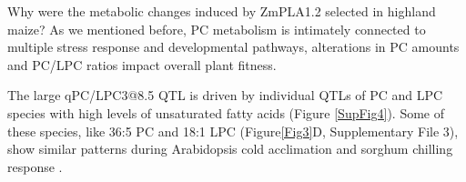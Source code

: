 \documentclass[9pt,twocolumn,twoside,lineno]{BioRxiv}
\begin{document}
Why were the metabolic changes induced by ZmPLA1.2 selected in highland maize?
As we mentioned before, PC metabolism is intimately connected to multiple stress response and developmental pathways, alterations in PC amounts and PC/LPC ratios impact overall plant fitness.

The large qPC/LPC3@8.5 QTL is driven by individual QTLs of PC and LPC species with high levels of unsaturated fatty acids (Figure \ref{SupFig4}).
Some of these species, like 36:5 PC and 18:1 LPC (Figure\ref{Fig3}D, Supplementary File 3), show similar patterns during Arabidopsis cold acclimation \cite{Welti2002-uk} and sorghum chilling response \cite{Marla2017-ph}.
\end{document}
